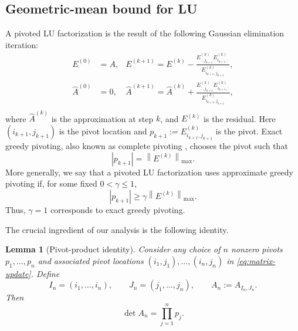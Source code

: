 \documentclass[11pt]{article}
\newtheorem{lemma}[lemma]{Lemma}
\theoremstyle{definition}
\theoremstyle{remark}
\newcommand{\norm}[1]{\left\lVert #1\right\rVert}
\newcommand{\abs}[1]{\left\lvert #1\right\rvert}
\begin{document}
\subsection{Geometric-mean bound for LU}
\label{subsec:matrix-lu-geometric-mean}

A pivoted LU factorization is the result of the following Gaussian elimination iteration:
\begin{equation}
\begin{aligned}
    E^{(0)}&=A, 
    & 
    E^{(k+1)} = E^{(k)}
    -
    \frac{
        E^{(k)}_{:,j_{k+1}}E^{(k)}_{i_{k+1},:}
    }{E^{(k)}_{i_{k+1},j_{k+1}}}, \\
    \widehat A^{(0)}&= 0, & 
        \widehat A^{(k+1)} = \widehat A^{(k)}
    +
    \frac{
        E^{(k)}_{:,j_{k+1}}E^{(k)}_{i_{k+1},:}
    }{E^{(k)}_{i_{k+1},j_{k+1}}} ,\\
\end{aligned}
\label{eq:matrix-update}
\end{equation}
where $\widehat A^{(k)}$ is the approximation at step $k$, and $E^{(k)}$ is the residual. 
Here $(i_{k+1},j_{k+1})$ is the pivot location and $p_{k+1}:=E^{(k)}_{i_{k+1},j_{k+1}}$ is the
pivot.
Exact greedy pivoting, also known as complete pivoting
\cite{trefethen_book}, chooses the pivot such that
\begin{equation*}
    \abs{p_{k+1}}
    =
    \norm{E^{(k)}}_{\max}.
\end{equation*}
More generally, we say that a pivoted LU factorization uses approximate greedy
pivoting if, for some fixed $0<\gamma\le1$,
\begin{equation}
    \abs{p_{k+1}}
    \ge
    \gamma\norm{E^{(k)}}_{\max}.
    \label{eq:weak-matrix-pivot}
\end{equation}
Thus, $\gamma=1$ corresponds to exact greedy pivoting.

The crucial ingredient of our analysis is the following identity.

\begin{lemma}[Pivot-product identity]
\label{lem:algorithmic-reduction}
Consider any choice of $n$ nonzero pivots $p_1,\ldots,p_n$ and
associated pivot locations
$
    (i_1,j_1),\ldots,(i_n,j_n)
$
in \eqref{eq:matrix-update}. Define
\[
    I_n=(i_1,\ldots,i_n),
    \qquad
    J_n=(j_1,\ldots,j_n),
    \qquad
    A_n:=A_{I_n,J_n}.
\]
Then
\begin{equation*}
    \det A_n=\prod_{j=1}^n p_j.
\end{equation*}
\end{lemma}
\end{document}
